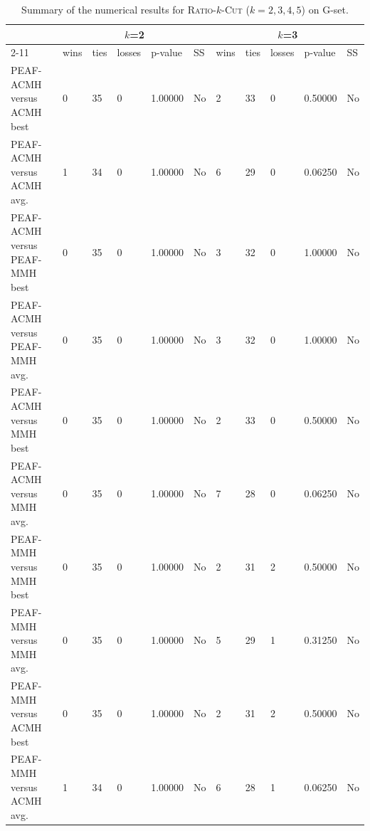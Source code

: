 \documentclass[12pt, a4paper]{article}%
\renewcommand{\arraystretch}{1.3}
\numberwithin{equation}{section}
\theoremstyle{plain}
\begin{document}
			{
				\scriptsize
				\setlength{\tabcolsep}{10pt}
				\renewcommand{\arraystretch}{1.6}
				\begin{landscape}
					\begin{longtable}{|l|lllll|lllll|}
						\caption[Summary for \textsc{Ratio}-$k$-\textsc{Cut}]{Summary of the numerical results for \textsc{Ratio}-$k$-\textsc{Cut} ($k=2,3,4,5$) on G-set.}
						\label{tab::ratio-summary}\\
						\hline
						\multicolumn{1}{|c|}{\multirow{2}{*}{}} & \multicolumn{5}{c|}{$k$=2}                    & \multicolumn{5}{c|}{$k$=3}                    \\ \cline{2-11} 
						\multicolumn{1}{|c|}{}                  & wins & ties & losses & p-value          & SS  & wins & ties & losses & p-value          & SS  \\ \hline
						PEAF-ACMH versus ACMH best             & 0    & 35   & 0      & 1.00000          & No  & 2    & 33   & 0      & 0.50000          & No  \\
						PEAF-ACMH versus ACMH avg.             & 1    & 34   & 0      & 1.00000          & No  & 6    & 29   & 0      & 0.06250          & No  \\
						PEAF-ACMH versus PEAF-MMH best           & 0    & 35   & 0      & 1.00000          & No  & 3    & 32   & 0      & 1.00000          & No  \\
						PEAF-ACMH versus PEAF-MMH avg.           & 0    & 35   & 0      & 1.00000          & No  & 3    & 32   & 0      & 1.00000          & No  \\
						PEAF-ACMH versus MMH best               & 0    & 35   & 0      & 1.00000          & No  & 2    & 33   & 0      & 0.50000          & No  \\
						PEAF-ACMH versus MMH avg.               & 0    & 35   & 0      & 1.00000          & No  & 7    & 28   & 0      & 0.06250          & No  \\
						PEAF-MMH versus MMH best                 & 0    & 35   & 0      & 1.00000          & No  & 2    & 31   & 2      & 0.50000          & No  \\
						PEAF-MMH versus MMH avg.                 & 0    & 35   & 0      & 1.00000          & No  & 5    & 29   & 1      & 0.31250          & No  \\
						PEAF-MMH versus ACMH best               & 0    & 35   & 0      & 1.00000          & No  & 2    & 31   & 2      & 0.50000          & No  \\
						PEAF-MMH versus ACMH avg.               & 1    & 34   & 0      & 1.00000          & No  & 6    & 28   & 1      & 0.06250          & No  \\

\end{longtable}
\end{landscape}}
\end{document}
